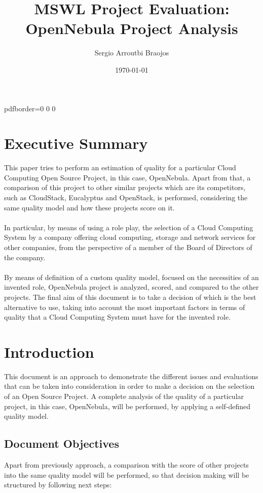 \documentclass[11pt]{article}
\title{\textbf{MSWL Project Evaluation: OpenNebula Project Analysis}}
\author{Sergio Arroutbi Braojos}
\date{\today}
\begin{document}
\hypersetup
{   
pdfborder={0 0 0}
}
   
\maketitle

\tableofcontents
\listoftables

\pagebreak

\section{Executive Summary}
This paper tries to perform an estimation of quality for a particular Cloud Computing Open Source Project, in this case, OpenNebula. Apart from that, a comparison of this project to other similar projects which are its competitors, such as CloudStack, Eucalyptus and OpenStack, is performed, considering the same quality model and how these projects score on it.\\
\\
In particular, by means of using a role play, the selection of a Cloud Computing System by a company offering cloud computing, storage and network services for other companies, from the perspective of a member of the Board of Directors of the company.\\
\\
By means of definition of a custom quality model, focused on the necessities of an invented role, OpenNebula project is analyzed, scored, and compared to the other projects. The final aim of this document is to take a decision of which is the best alternative to use, taking into account the most important factors in terms of quality that a Cloud Computing System must have for the invented role.

\section{Introduction} \label{sec:introduction}
This document is an approach to demonstrate the different issues and evaluations that can be taken into consideration in order to make a decision on the selection of an Open Source Project. A complete analysis of the quality of a particular project, in this case, OpenNebula, will be performed, by applying a self-defined quality model. 

\subsection{Document Objectives}
Apart from previously approach, a comparison with the score of other projects into the same quality model will be performed, so that decision making will be structured by following next steps:
\end{document}
